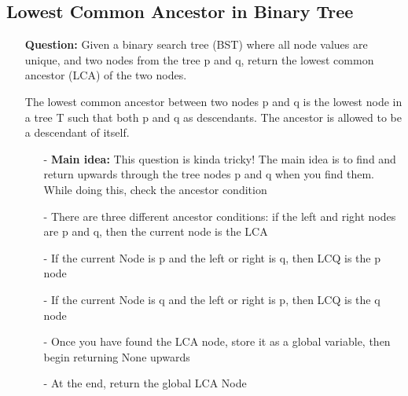 \documentclass[12pt]{article}
\begin{document}
\subsection{Lowest Common Ancestor in Binary Tree}
\begin{enumerate}
  \item[] \textbf{Question:} Given a binary search tree (BST) where all node values are unique, and two nodes from the tree p and q, return the lowest common ancestor (LCA) of the two nodes.

The lowest common ancestor between two nodes p and q is the lowest node in a tree T such that both p and q as descendants. The ancestor is allowed to be a descendant of itself. 


    \begin{enumerate}
      \item[-] \textbf{Main idea:} This question is kinda tricky! The main idea is to find and return upwards through the tree nodes p and q when you find them. While doing this, check the ancestor condition
      \item[-] There are three different ancestor conditions: if the left and right nodes are p and q, then the current node is the LCA
      \item[-] If the current Node is p and the left or right is q, then LCQ is the p node
      \item[-] If the current Node is q and the left or right is p, then LCQ is the q node
      \item[-] Once you have found the LCA node, store it as a global variable, then begin returning None upwards
      \item[-] At the end, return the global LCA Node

    \end{enumerate}
\end{enumerate}
\end{document}
